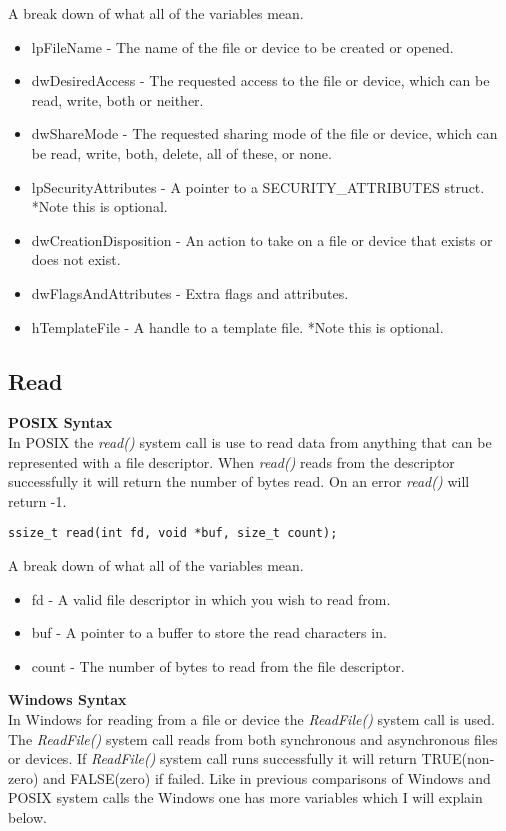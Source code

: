 \documentclass[letterpaper,10pt,notitlepage,fleqn]{article}
\begin{document}
A break down of what all of the variables mean.

\begin{itemize}
\item lpFileName - The name of the file or device to be created or opened.
\item dwDesiredAccess - The requested access to the file or device, which can be read, write, both or neither.
\item dwShareMode - The requested sharing mode of the file or device, which can be read, write, both, delete, all of these, or none.
\item lpSecurityAttributes - A pointer to a SECURITY\_ATTRIBUTES struct. *Note this is optional.
\item dwCreationDisposition - An action to take on a file or device that exists or does not exist.
\item dwFlagsAndAttributes - Extra flags and attributes.
\item hTemplateFile - A handle to a template file. *Note this is optional.
\end{itemize}

\subsection{Read}
\textbf{POSIX Syntax} \\
In POSIX the \textit{read()} system call is use to read data from anything that can be represented with a file descriptor. When \textit{read()} reads from the descriptor successfully it will return the number of bytes read. On an error \textit{read()} will return -1. 

\begin{verbatim}
ssize_t read(int fd, void *buf, size_t count);
\end{verbatim}

A break down of what all of the variables mean.

\begin{itemize}
\item fd - A valid file descriptor in which you wish to read from.
\item buf - A pointer to a buffer to store the read characters in.
\item count - The number of bytes to read from the file descriptor.
\end{itemize}

\textbf{Windows Syntax} \\
In Windows for reading from a file or device the \textit{ReadFile()} system call is used. The \textit{ReadFile()} system call reads from both synchronous and asynchronous files or devices. If \textit{ReadFile()} system call runs successfully it will return TRUE(non-zero) and FALSE(zero) if failed. Like in previous comparisons of Windows and POSIX system calls the Windows one has more variables which I will explain below.
\end{document}

